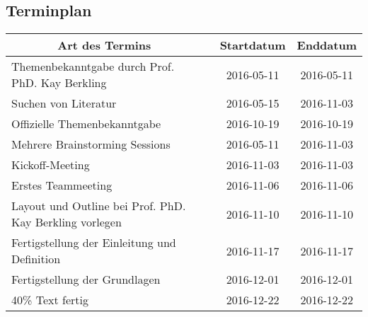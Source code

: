 \pagebreak
\subsection{Terminplan}
\begin{tabular}{|p{6cm}|p{3.5cm}|c|c|}
\hline
\multicolumn{1}{|c|}{\textbf{Art des Termins}}               & \centering{\textbf{Teilnehmer}}                                  &              \textbf{Startdatum} & \textbf{Enddatum} \\ \hline
Themenbekanntgabe durch Prof. PhD. Kay Berkling              & \centering{Kay Berkling, Marc Mahler}                            & 2016-05-11          & 2016-05-11        \\ \hline
Suchen von Literatur                                         & \centering{Marvin Zerulla}                                       & 2016-05-15          & 2016-11-03        \\ \hline
Offizielle Themenbekanntgabe                                 & \centering{Marc Mahler, Marvin Zerulla}                          & 2016-10-19          & 2016-10-19        \\ \hline
Mehrere Brainstorming  Sessions                              & \centering{Marc Mahler, Marvin Zerulla}                          & 2016-05-11          & 2016-11-03        \\ \hline
Kickoff-Meeting                                              & \centering{Marc Mahler, Marvin Zerulla, Prof. PhD. Kay Berkling} & 2016-11-03          & 2016-11-03        \\ \hline
Erstes Teammeeting                                           & \centering{Marc Mahler, Marvin Zerulla}                          & 2016-11-06          & 2016-11-06        \\ \hline
Layout und Outline bei Prof. PhD. Kay Berkling vorlegen      & \centering{Marc Mahler, Marvin Zerulla, Prof. PhD. Kay Berkling} & 2016-11-10          & 2016-11-10        \\ \hline
Fertigstellung der  Einleitung und  Definition               & \centering{Marc Mahler, Marvin Zerulla}                          & 2016-11-17          & 2016-11-17        \\ \hline
Fertigstellung der Grundlagen                                & \centering{Marc Mahler, Marvin Zerulla}                          & 2016-12-01          & 2016-12-01        \\ \hline
40\% Text fertig                                             & \centering{Marc Mahler, Marvin Zerulla}                          & 2016-12-22          & 2016-12-22        \\ \hline

\end{tabular}
